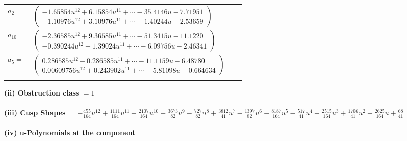 \documentclass[1p]{elsarticle_modified}
\theoremstyle{definition}
\begin{document}
\begin{tabular}{m{7pt} m{180pt} m{7pt} m{180pt} }
\flushright $a_{2}=$&$\begin{pmatrix}-1.65854 u^{12}+6.15854 u^{11}+\cdots-35.4146 u-7.71951\\-1.10976 u^{12}+3.10976 u^{11}+\cdots-1.40244 u-2.53659\end{pmatrix}$ \\
\flushright $a_{10}=$&$\begin{pmatrix}-2.36585 u^{12}+9.36585 u^{11}+\cdots-51.3415 u-11.1220\\-0.390244 u^{12}+1.39024 u^{11}+\cdots-6.09756 u-2.46341\end{pmatrix}$ \\
\flushright $a_{5}=$&$\begin{pmatrix}0.286585 u^{12}-0.286585 u^{11}+\cdots-11.1159 u-6.48780\\0.00609756 u^{12}+0.243902 u^{11}+\cdots-5.81098 u-0.664634\end{pmatrix}$\\&\end{tabular}
\flushleft \textbf{(ii) Obstruction class $= 1$}\\~\\
\flushleft \textbf{(iii) Cusp Shapes $= -\frac{455}{164} u^{12}+\frac{1111}{164} u^{11}+\frac{2107}{164} u^{10}-\frac{3673}{82} u^9-\frac{727}{82} u^8+\frac{3812}{41} u^7-\frac{1397}{82} u^6-\frac{8187}{164} u^5-\frac{517}{41} u^4-\frac{2515}{164} u^3+\frac{1706}{41} u^2-\frac{2625}{164} u+\frac{68}{41}$}\\~\\
\newpage\renewcommand{\arraystretch}{1}
\flushleft \textbf{(iv) u-Polynomials at the component}\newline \\
\end{document}
